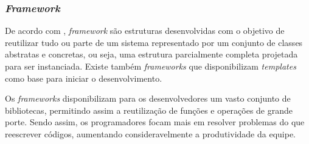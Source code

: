 \subsubsection{\textit{Framework}}

De acordo com , \textit{framework} são estruturas desenvolvidas com o objetivo de reutilizar tudo ou parte de um sistema representado por um conjunto de classes abstratas e concretas, ou seja,  uma estrutura parcialmente completa projetada para ser instanciada. Existe também \textit{frameworks}  que disponibilizam \textit{templates} como base para iniciar o desenvolvimento.

Os \textit{frameworks} disponibilizam para os desenvolvedores um vasto conjunto de bibliotecas, permitindo assim a reutilização de funções e operações de grande porte. Sendo assim, os programadores focam mais em resolver problemas do que reescrever códigos, aumentando consideravelmente a produtividade da equipe. 